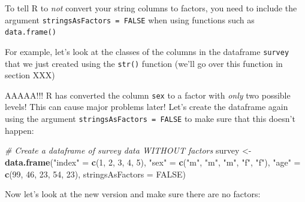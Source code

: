 \documentclass[]{book}
\newenvironment{Shaded}{\begin{snugshade}}{\end{snugshade}}
\newcommand{\KeywordTok}[1]{\textcolor[rgb]{0.13,0.29,0.53}{\textbf{#1}}}
\newcommand{\DataTypeTok}[1]{\textcolor[rgb]{0.13,0.29,0.53}{#1}}
\newcommand{\DecValTok}[1]{\textcolor[rgb]{0.00,0.00,0.81}{#1}}
\newcommand{\StringTok}[1]{\textcolor[rgb]{0.31,0.60,0.02}{#1}}
\newcommand{\CommentTok}[1]{\textcolor[rgb]{0.56,0.35,0.01}{\textit{#1}}}
\newcommand{\OtherTok}[1]{\textcolor[rgb]{0.56,0.35,0.01}{#1}}
\newcommand{\NormalTok}[1]{#1}
\theoremstyle{definition}
\theoremstyle{definition}
\theoremstyle{remark}
\begin{document}
To tell R to \emph{not} convert your string columns to factors, you need
to include the argument \texttt{stringsAsFactors\ =\ FALSE} when using
functions such as \texttt{data.frame()}

For example, let's look at the classes of the columns in the dataframe
\texttt{survey} that we just created using the \texttt{str()} function
(we'll go over this function in section XXX)

\begin{Shaded}
\end{Shaded}

AAAAA!!! R has converted the column \texttt{sex} to a factor with
\emph{only} two possible levels! This can cause major problems later!
Let's create the dataframe again using the argument
\texttt{stringsAsFactors\ =\ FALSE} to make sure that this doesn't
happen:

\begin{Shaded}
\begin{Highlighting}[]
\CommentTok{# Create a dataframe of survey data WITHOUT factors}
\NormalTok{survey <-}\StringTok{ }\KeywordTok{data.frame}\NormalTok{(}\StringTok{"index"}\NormalTok{ =}\StringTok{ }\KeywordTok{c}\NormalTok{(}\DecValTok{1}\NormalTok{, }\DecValTok{2}\NormalTok{, }\DecValTok{3}\NormalTok{, }\DecValTok{4}\NormalTok{, }\DecValTok{5}\NormalTok{),}
                     \StringTok{"sex"}\NormalTok{ =}\StringTok{ }\KeywordTok{c}\NormalTok{(}\StringTok{"m"}\NormalTok{, }\StringTok{"m"}\NormalTok{, }\StringTok{"m"}\NormalTok{, }\StringTok{"f"}\NormalTok{, }\StringTok{"f"}\NormalTok{),}
                     \StringTok{"age"}\NormalTok{ =}\StringTok{ }\KeywordTok{c}\NormalTok{(}\DecValTok{99}\NormalTok{, }\DecValTok{46}\NormalTok{, }\DecValTok{23}\NormalTok{, }\DecValTok{54}\NormalTok{, }\DecValTok{23}\NormalTok{),}
                     \DataTypeTok{stringsAsFactors =} \OtherTok{FALSE}\NormalTok{)}
\end{Highlighting}
\end{Shaded}

Now let's look at the new version and make sure there are no factors:
\end{document}
